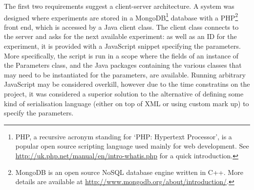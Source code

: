 The first two requirements suggest a client-server architecture.  A system was designed where experiments are stored in a MongoDB\footnote{PHP, a recursive acronym standing for `PHP: Hypertext Processor', is a popular open source scripting language used mainly for web development.  See \url{http://uk.php.net/manual/en/intro-whatis.php} for a quick introduction.} database with a PHP\footnote{MongoDB is an open source NoSQL database engine written in C++.  More details are available at \url{http://www.mongodb.org/about/introduction/}.} front end, which is accessed by a Java client class.  The client class connects to the server and asks for the next available experiment: as well as an ID for the experiment, it is provided with a JavaScript snippet specifying the parameters.  More specifically, the script is run in a scope where the fields of an instance of the Parameters class, and the Java packages containing the various classes that may need to be instantiated for the parameters, are available.  Running arbitrary JavaScript may be considered overkill, however due to the time constratins on the project, it was considered a superior solution to the alternative of defining some kind of serialisation language (either on top of XML or using custom mark up) to specify the parameters.

